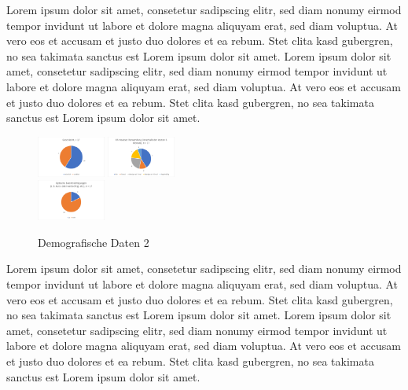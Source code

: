\documentclass[conference]{IEEEtran}
\begin{document}
Lorem ipsum dolor sit amet, consetetur sadipscing elitr, sed diam nonumy eirmod tempor invidunt ut labore et dolore magna aliquyam erat, sed diam voluptua. At vero eos et accusam et justo duo dolores et ea rebum. Stet clita kasd gubergren, no sea takimata sanctus est Lorem ipsum dolor sit amet. Lorem ipsum dolor sit amet, consetetur sadipscing elitr, sed diam nonumy eirmod tempor invidunt ut labore et dolore magna aliquyam erat, sed diam voluptua. At vero eos et accusam et justo duo dolores et ea rebum. Stet clita kasd gubergren, no sea takimata sanctus est Lorem ipsum dolor sit amet.

\begin{figure}[ht]
	\centering
	\includegraphics[width=0.2\textwidth]{assets/gesch.png} \hspace{-5pt}
	\includegraphics[width=0.2\textwidth]{assets/headset.png} \\
	\vspace{2pt}
	\includegraphics[width=0.2\textwidth]{assets/optBeein.png} 
	\caption{Demografische Daten 2}
	\label{fig:Demografische Daten 2}
\end{figure}
Lorem ipsum dolor sit amet, consetetur sadipscing elitr, sed diam nonumy eirmod tempor invidunt ut labore et dolore magna aliquyam erat, sed diam voluptua. At vero eos et accusam et justo duo dolores et ea rebum. Stet clita kasd gubergren, no sea takimata sanctus est Lorem ipsum dolor sit amet. Lorem ipsum dolor sit amet, consetetur sadipscing elitr, sed diam nonumy eirmod tempor invidunt ut labore et dolore magna aliquyam erat, sed diam voluptua. At vero eos et accusam et justo duo dolores et ea rebum. Stet clita kasd gubergren, no sea takimata sanctus est Lorem ipsum dolor sit amet.
\end{document}
